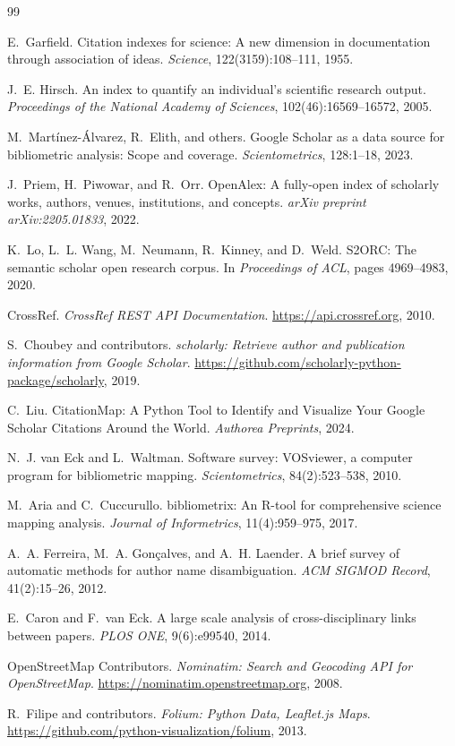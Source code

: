 \documentclass[11pt]{article}
\begin{document}

\begin{thebibliography}{99}

E.~Garfield.
Citation indexes for science: A new dimension in documentation through
association of ideas.
\textit{Science}, 122(3159):108--111, 1955.

J.~E. Hirsch.
An index to quantify an individual's scientific research output.
\textit{Proceedings of the National Academy of Sciences},
102(46):16569--16572, 2005.

M.~Martínez-Álvarez, R.~Elith, and others.
Google Scholar as a data source for bibliometric analysis: Scope and coverage.
\textit{Scientometrics}, 128:1--18, 2023.

J.~Priem, H.~Piwowar, and R.~Orr.
OpenAlex: A fully-open index of scholarly works, authors, venues,
institutions, and concepts.
\textit{arXiv preprint arXiv:2205.01833}, 2022.

K.~Lo, L.~L. Wang, M.~Neumann, R.~Kinney, and D.~Weld.
S2ORC: The semantic scholar open research corpus.
In \textit{Proceedings of ACL}, pages 4969--4983, 2020.

CrossRef.
\textit{CrossRef REST API Documentation}.
\url{https://api.crossref.org}, 2010.

S.~Choubey and contributors.
\textit{scholarly: Retrieve author and publication information from
Google Scholar}.
\url{https://github.com/scholarly-python-package/scholarly}, 2019.

C.~Liu.
CitationMap: A Python Tool to Identify and Visualize Your Google Scholar
Citations Around the World.
\textit{Authorea Preprints}, 2024.

N.~J. van Eck and L.~Waltman.
Software survey: VOSviewer, a computer program for bibliometric mapping.
\textit{Scientometrics}, 84(2):523--538, 2010.

M.~Aria and C.~Cuccurullo.
bibliometrix: An R-tool for comprehensive science mapping analysis.
\textit{Journal of Informetrics}, 11(4):959--975, 2017.

A.~A. Ferreira, M.~A. Gonçalves, and A.~H. Laender.
A brief survey of automatic methods for author name disambiguation.
\textit{ACM SIGMOD Record}, 41(2):15--26, 2012.

E.~Caron and F.~van Eck.
A large scale analysis of cross-disciplinary links between papers.
\textit{PLOS ONE}, 9(6):e99540, 2014.

OpenStreetMap Contributors.
\textit{Nominatim: Search and Geocoding API for OpenStreetMap}.
\url{https://nominatim.openstreetmap.org}, 2008.

R.~Filipe and contributors.
\textit{Folium: Python Data, Leaflet.js Maps}.
\url{https://github.com/python-visualization/folium}, 2013.

\end{thebibliography}
\end{document}
